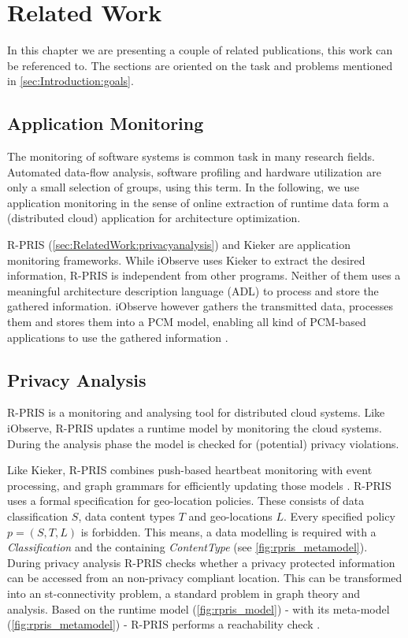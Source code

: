 \chapter{Related Work}
\label{ch:RelatedWork}

In this chapter we are presenting a couple of related publications, this work can be referenced to. The sections are oriented on the task and problems mentioned in \autoref{sec:Introduction:goals}.


\section{Application Monitoring}
\label{sec:RelatedWork:appl_mon}

The monitoring of software systems is common task in many research fields. Automated data-flow analysis, software profiling and hardware utilization are only a small selection of groups, using this term. In the following, we use application monitoring in the sense of online extraction of runtime data form a (distributed cloud) application for architecture optimization.

R-PRIS (\autoref{sec:RelatedWork:privacyanalysis}) and Kieker are application monitoring frameworks. While iObserve uses Kieker to extract the desired information, R-PRIS is independent from other programs. Neither of them uses a meaningful architecture description language (ADL) to process and store the gathered information. iObserve however gathers the transmitted data, processes them and stores them into a PCM model, enabling all kind of PCM-based applications to use the gathered information \cite{kieker.web}\cite{Schmieders.}\cite{Heinrich.2016}.


\section{Privacy Analysis}
\label{sec:RelatedWork:privacyanalysis}

R-PRIS is a monitoring and analysing tool for distributed cloud systems. Like iObserve, R-PRIS updates a runtime model by monitoring the cloud systems. During the analysis phase the model is checked for (potential) privacy violations.

Like Kieker, R-PRIS combines push-based heartbeat monitoring with event processing, and graph grammars for efficiently updating those models \cite{Schmieders.}. R-PRIS uses a formal specification for geo-location policies. These consists of data classification $S$, data content types $T$ and geo-locations $L$. Every specified policy $p = (S, T, L)$ is forbidden. This means, a data modelling is required with a \textit{Classification} and the containing \textit{ContentType} (see \autoref{fig:rpris_metamodel}). During privacy analysis R-PRIS checks whether a privacy protected information can be accessed from an non-privacy compliant location. This can be transformed into an st-connectivity problem, a standard problem in graph theory and analysis. Based on the runtime model (\autoref{fig:rpris_model}) - with its meta-model (\autoref{fig:rpris_metamodel}) - R-PRIS performs a reachability check \cite{Schmieders.2015}. 

